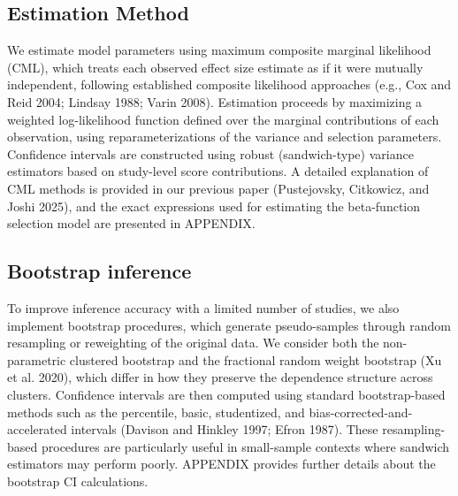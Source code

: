 \documentclass[
]{article}
\begin{document}
\subsection{Estimation Method}\label{estimation-method}

We estimate model parameters using maximum composite marginal likelihood
(CML), which treats each observed effect size estimate as if it were
mutually independent, following established composite likelihood
approaches (e.g., Cox and Reid 2004; Lindsay 1988; Varin 2008).
Estimation proceeds by maximizing a weighted log-likelihood function
defined over the marginal contributions of each observation, using
reparameterizations of the variance and selection parameters. Confidence
intervals are constructed using robust (sandwich-type) variance
estimators based on study-level score contributions. A detailed
explanation of CML methods is provided in our previous paper
(Pustejovsky, Citkowicz, and Joshi 2025), and the exact expressions used
for estimating the beta-function selection model are presented in
APPENDIX.

\subsection{Bootstrap inference}\label{bootstrap-inference}

To improve inference accuracy with a limited number of studies, we also
implement bootstrap procedures, which generate pseudo-samples through
random resampling or reweighting of the original data. We consider both
the non-parametric clustered bootstrap and the fractional random weight
bootstrap (Xu et al. 2020), which differ in how they preserve the
dependence structure across clusters. Confidence intervals are then
computed using standard bootstrap-based methods such as the percentile,
basic, studentized, and bias-corrected-and-accelerated intervals
(Davison and Hinkley 1997; Efron 1987). These resampling-based
procedures are particularly useful in small-sample contexts where
sandwich estimators may perform poorly. APPENDIX provides further
details about the bootstrap CI calculations.
\end{document}
